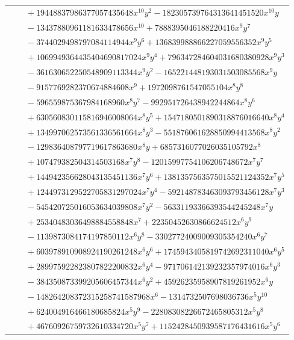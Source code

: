 \documentclass[11pt]{article}
\begin{document}
\begin{longtable}{@{}ll@{}}
 & $\quad +19448837986377057435648x^{10}y^{2}-182305739764313641451520x^{10}y$\\
 & $\quad -13437880961181633478656x^{10}+7888395046188220416x^{9}y^{7}$\\
 & $\quad -3744029498797084114944x^{9}y^{6}+136839988866227059556352x^{9}y^{5}$\\
 & $\quad +1069949364435404690817024x^{9}y^{4}+796347284604031680380928x^{9}y^{3}$\\
 & $\quad -361630652250548909113344x^{9}y^{2}-165221448193031503085568x^{9}y$\\
 & $\quad -9157769282370674884608x^{9}+1972098761547055104x^{8}y^{8}$\\
 & $\quad -596559875367984168960x^{8}y^{7}-992951726438942244864x^{8}y^{6}$\\
 & $\quad +630560830115816946008064x^{8}y^{5}+1547180501890318876016640x^{8}y^{4}$\\
 & $\quad +134997062573561336561664x^{8}y^{3}-551876061628850994413568x^{8}y^{2}$\\
 & $\quad -129836408797719617863680x^{8}y+6857316077026035105792x^{8}$\\
 & $\quad +107479382504314503168x^{7}y^{8}-12015997754106206748672x^{7}y^{7}$\\
 & $\quad +144942356628043135451136x^{7}y^{6}+1381357563575015521124352x^{7}y^{5}$\\
 & $\quad +1244973129522705831297024x^{7}y^{4}-592148783463093793456128x^{7}y^{3}$\\
 & $\quad -545420725016053634039808x^{7}y^{2}-56331193366393544245248x^{7}y$\\
 & $\quad +25340483036498884558848x^{7}+22350452630866624512x^{6}y^{9}$\\
 & $\quad -1139873084174197850112x^{6}y^{8}-33027724009009305354240x^{6}y^{7}$\\
 & $\quad +603978910908924190261248x^{6}y^{6}+1745943405819742692311040x^{6}y^{5}$\\
 & $\quad +289975922823807822200832x^{6}y^{4}-971706142139232357974016x^{6}y^{3}$\\
 & $\quad -384350873399205606457344x^{6}y^{2}+45926235958907819261952x^{6}y$\\
 & $\quad -148264208372315258741587968x^{6}-1314732507698036736x^{5}y^{10}$\\
 & $\quad +624004916466180685824x^{5}y^{9}-22808308226672465805312x^{5}y^{8}$\\
 & $\quad +46760926759732610334720x^{5}y^{7}+1152428450939587176431616x^{5}y^{6}$\\

\end{longtable}
\end{document}

